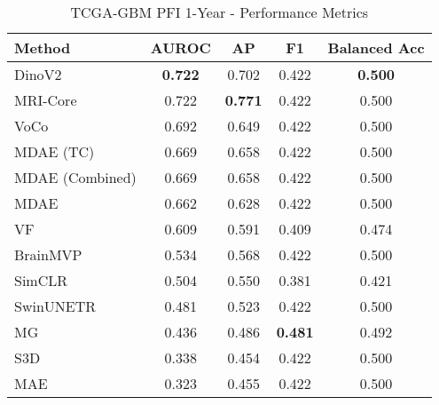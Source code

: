 \begin{table}[ht]
\centering
\caption{TCGA-GBM PFI 1-Year - Performance Metrics}
\label{tab:tcga_gbm_pfi_1year}
\begin{tabular}{lcccc}
\toprule
Method & AUROC & AP & F1 & Balanced Acc \\
\midrule
DinoV2 & \textbf{0.722} & 0.702 & 0.422 & \textbf{0.500} \\
MRI-Core & 0.722 & \textbf{0.771} & 0.422 & 0.500 \\
VoCo & 0.692 & 0.649 & 0.422 & 0.500 \\
MDAE (TC) & 0.669 & 0.658 & 0.422 & 0.500 \\
MDAE (Combined) & 0.669 & 0.658 & 0.422 & 0.500 \\
MDAE & 0.662 & 0.628 & 0.422 & 0.500 \\
VF & 0.609 & 0.591 & 0.409 & 0.474 \\
BrainMVP & 0.534 & 0.568 & 0.422 & 0.500 \\
SimCLR & 0.504 & 0.550 & 0.381 & 0.421 \\
SwinUNETR & 0.481 & 0.523 & 0.422 & 0.500 \\
MG & 0.436 & 0.486 & \textbf{0.481} & 0.492 \\
S3D & 0.338 & 0.454 & 0.422 & 0.500 \\
MAE & 0.323 & 0.455 & 0.422 & 0.500 \\
\bottomrule
\end{tabular}
\end{table}
